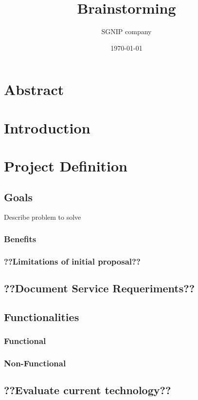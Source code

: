 \documentclass{sgnip}
\title{Brainstorming}
\date{\today}
\author{SGNIP company}
\begin{document}
\maketitle
\tableofcontents
\newpage
\chapter{Abstract}

\chapter{Introduction}

\chapter{Project Definition}

\section{Goals}

Describe problem to solve

\subsection{Benefits}

\subsection{??Limitations of initial proposal??}

\section{??Document Service Requeriments??}

\section{Functionalities}

\subsection{Functional}

\subsection{Non-Functional}


\section{??Evaluate current technology??}
\end{document}
